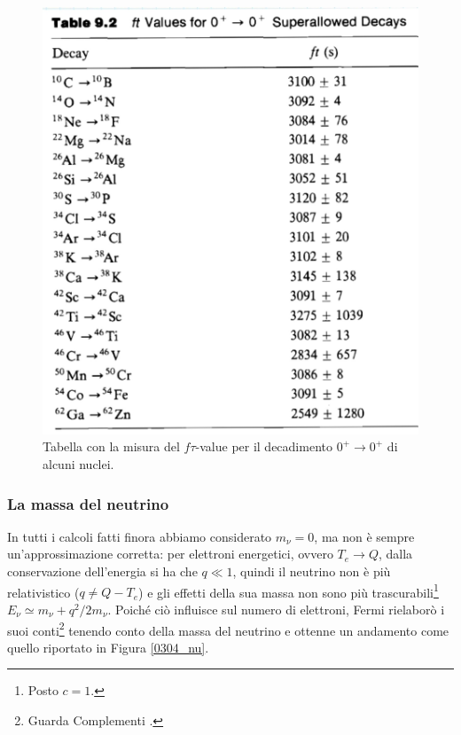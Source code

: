 \begin{figure}
    \centering
    \includegraphics[scale=0.2]{Immagini/0304_dati.png}
    \caption{Tabella con la misura del $f\tau$-value per il decadimento $0^+\to0^+$ di alcuni nuclei.}
    \label{0304_dati2}
\end{figure}

\subsubsection{La massa del neutrino}\label{sec-nu-mass}
In tutti i calcoli fatti finora abbiamo considerato $m_\nu=0$, ma non è sempre un'approssimazione corretta: per elettroni energetici, ovvero $T_e\to Q$, dalla conservazione dell'energia si ha che $q\ll 1$, quindi il neutrino non è più relativistico ($q\not = Q-T_e$) e gli effetti della sua massa non sono più trascurabili\footnote{Posto $c=1$.} $E_\nu \simeq m_\nu + q^2/2m_\nu$. Poiché ciò influisce sul numero di elettroni, Fermi rielaborò i suoi conti\footnote{Guarda Complementi .} tenendo conto della massa del neutrino e ottenne un andamento come quello riportato in Figura \ref{0304_nu}.

